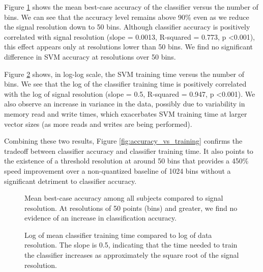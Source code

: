 Figure \ref{fig:accuracy_vs_bins} shows the mean best-case accuracy of the classifier versus the number of bins. We can see that the accuracy level remains above 90\% even as we reduce the signal resolution down to 50 bins. Although classifier accuracy is positively correlated with signal resolution (slope = 0.0013, R-squared = 0.773, p \textless 0.001), this effect appears only at resolutions lower than 50 bins. We find no significant difference in SVM accuracy at resolutions over 50 bins.

Figure \ref{fig:training_vs_bins} shows, in log-log scale, the SVM training time versus the number of bins. We see that the log of the classifier training time is positively correlated with the log of signal resolution (slope = 0.5, R-squared = 0.947, p \textless 0.001). We also observe an increase in variance in the data, possibly due to variability in memory read and write times, which exacerbates SVM training time at larger vector sizes (as more reads and writes are being performed).

Combining these two results, Figure \ref{fig:accuracy_vs_training} confirms the tradeoff between classifier accuracy and classifier training time. It also points to the existence of a threshold resolution at around 50 bins that provides a 450\% speed improvement over a non-quantized baseline of 1024 bins without a significant detriment to classifier accuracy.


\begin{figure}[!h]
  \centering
   {}
  \caption{Mean best-case accuracy among all subjects compared to signal resolution. At resolutions of 50 points (bins) and greater, we find no evidence of an increase in classification accuracy. }
  \label{fig:accuracy_vs_bins}
  \vspace{-0.1cm}
 \end{figure}

 \begin{figure}[!h]
  \vspace{-0.2cm}
  \centering
   {}
  \caption{Log of mean classifier training time compared to log of data resolution. The slope is 0.5, indicating that the time needed to train the classifier increases as approximately the square root of the signal resolution.}
  \label{fig:training_vs_bins}
  \vspace{-0.1cm}
 \end{figure}

